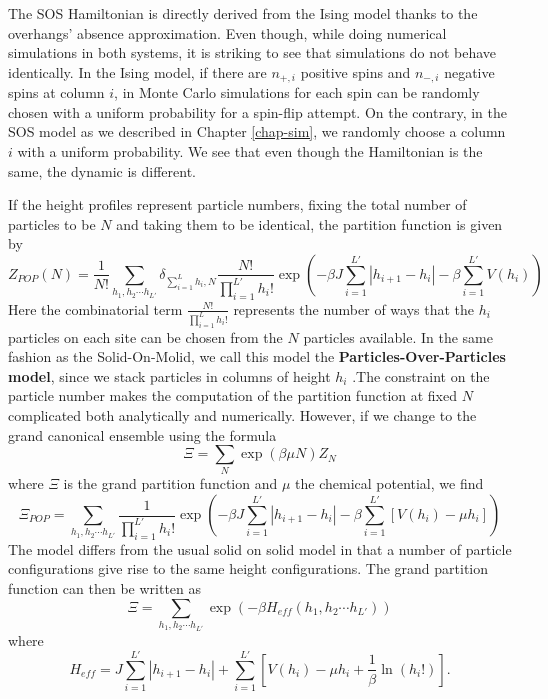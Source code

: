 The SOS Hamiltonian is directly derived from the Ising model thanks to the overhangs' absence approximation. Even though, while doing numerical simulations in both systems, it is striking to see that simulations do not behave identically. In the Ising model, if there are $n_{+,i}$ positive spins and $n_{-,i}$ negative spins at column $i$, in Monte Carlo simulations for each spin can be randomly chosen with a uniform probability for a spin-flip attempt. On the contrary, in the SOS model as we described in Chapter \ref{chap-sim}, we randomly choose a column $i$ with a uniform probability. We see that even though the Hamiltonian is the same, the dynamic is different.

If the height profiles represent particle numbers, fixing the total number of particles to be $N$ and taking them to be identical, the partition function is given by
\begin{equation}
Z_{POP}(N) = \frac{1}{N!}\sum_{h_1,h_2\cdots h_{L'}} \delta_{\sum_{i=1}^L h_i, N}\frac{N!}{\prod_{i=1}^{L'} h_i!} \exp\left(-\beta J \sum_{i=1}^{L'} |h_{i+1}-h_i| -\beta\sum_{i=1}^{L'} V(h_i)\right)
\end{equation}
Here the combinatorial term $\frac{N!}{\prod_{i=1}^L h_i!}$ represents the number of ways that the $h_i$ particles on each site can be chosen from the $N$ particles available. In the same fashion as the Solid-On-Molid, we call this model the \textbf{Particles-Over-Particles model}, since we stack particles in columns of height $h_i$ .The constraint on the particle number makes the computation of the partition function at fixed $N$ complicated both analytically and numerically. However, if we change to the grand canonical ensemble using
the formula
\begin{equation}
\Xi = \sum_{N} \exp(\beta\mu N) Z_N
\end{equation}
where $\Xi$ is the grand partition function and $\mu$ the chemical potential, we find
\begin{equation}
\Xi_{POP} = \sum_{h_1,h_2\cdots h_{L'}} \frac{1}{\prod_{i=1}^{L'} h_i!} \exp\left(-\beta J \sum_{i=1}^{L'} |h_{i+1}-h_i| -\beta\sum_{i=1}^{L'}[ V(h_i)-\mu h_i]\right)
\end{equation}
The model differs from the usual solid on solid model in that a number of particle configurations give rise to the same height configurations. The grand partition function can then be written as 
\begin{equation}
\Xi = \sum_{h_1,h_2\cdots h_{L'}} \exp\left(-\beta H_{eff}(h_1,h_2\cdots h_{L'})\right)
\end{equation}
where 
\begin{equation}
H_{eff}= J \sum_{i=1}^{L'} |h_{i+1}-h_i| +\sum_{i=1}^{L'} [V(h_i)-\mu h_i +\frac{1}{\beta}\ln(h_i !)].
\end{equation}

